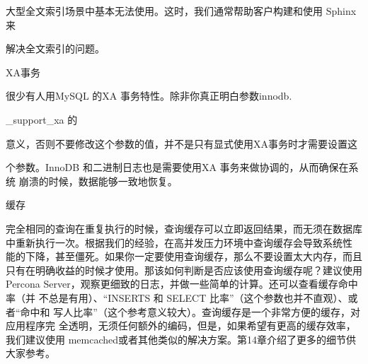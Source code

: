 大型全文索引场景中基本无法使用。这时，我们通常帮助客户构建和使用 Sphinx 来

解决全文索引的问题。

XA事务

很少有人用MySQL 的XA 事务特性。除非你真正明白参数innodb.

\_support\_xa 的

意义，否则不要修改这个参数的值，并不是只有显式使用XA事务时才需要设置这

个参数。InnoDB 和二进制日志也是需要使用XA 事务来做协调的，从而确保在系统
崩溃的时候，数据能够一致地恢复。

缓存

完全相同的查询在重复执行的时候，查询缓存可以立即返回结果，而无须在数据库
中重新执行一次。根据我们的经验，在高并发压力环境中查询缓存会导致系统性
能的下降，甚至僵死。如果你一定要使用查询缓存，那么不要设置太大内存，而且
只有在明确收益的时候才使用。那该如何判断是否应该使用查询缓存呢？建议使用
Percona Server，观察更细致的日志，并做一些简单的计算。还可以查看缓存命中率（并
不总是有用）、“INSERTS 和 SELECT 比率”（这个参数也并不直观）、或者“命中和
写人比率”（这个参考意义较大）。查询缓存是一个非常方便的缓存，对应用程序完
全透明，无须任何额外的编码，但是，如果希望有更高的缓存效率，我们建议使用
memcached或者其他类似的解决方案。第14章介绍了更多的细节供大家参考。


